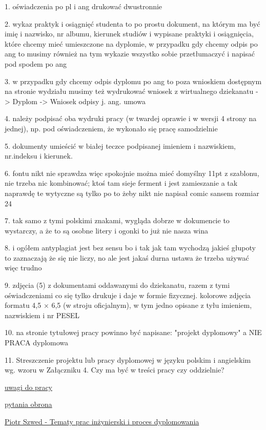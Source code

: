 1. oświadczenia po pl i ang drukować dwustronnie

2. wykaz praktyk i osiągnięć studenta to po prostu dokument, na którym ma być imię i nazwisko, nr albumu, kierunek studiów i wypisane praktyki i osiągnięcia, które chcemy mieć umieszczone na dyplomie, w przypadku gdy chcemy odpis po ang to musimy również na tym wykazie wszystko sobie przetłumaczyć i napisać pod spodem po ang
    
3. w przypadku gdy chcemy odpis dyplomu po ang to poza wnioskiem dostępnym na stronie wydziału musimy też wydrukować wniosek z wirtualnego dziekanatu -> Dyplom -> Wniosek odpisy j. ang. umowa 

4. należy podpisać oba wydruki pracy (w twardej oprawie i w wersji 4 strony na jednej), np. pod oświadczeniem, że wykonało się pracę samodzielnie 

5. dokumenty umieścić w białej teczce podpisanej imieniem i nazwiskiem, nr.indeksu i kierunek.

6. fontu nikt nie sprawdza więc spokojnie można mieć domyślny 11pt z szablonu, nie trzeba nic kombinować; ktoś tam sieje ferment i jest zamieszanie a tak naprawdę te wytyczne są tylko po to żeby nikt nie napisał comic sansem rozmiar 24

7. tak samo z tymi polskimi znakami, wygląda dobrze w dokumencie to wystarczy, a że to są osobne litery i ogonki to już nie nasza wina

8. i ogółem antyplagiat jest bez sensu bo i tak jak tam wychodzą jakieś głupoty to zaznaczają że się nie liczy, no ale jest jakaś durna ustawa że trzeba używać więc trudno

9. zdjęcia (5) z dokumentami oddawanymi do dziekanatu, razem z tymi oświadczeniami co się tylko drukuje i daje w formie fizycznej. kolorowe zdjęcia formatu 4,5 × 6,5 (w stroju oficjalnym), w tym jedno opisane z tyłu imieniem, nazwiskiem i nr PESEL

10. na stronie tytułowej pracy powinno być napisane: "projekt dyplomowy" a NIE PRACA dyplomowa

11. Streszczenie projektu lub pracy dyplomowej w języku polskim i angielskim wg. wzoru w Załączniku 4. Czy ma być w treści pracy czy oddzielnie?


\href{
https://docs.google.com/document/d/1teuj2QOWyLMdtm7R-8wHDmPq2z-jhPZ2pBM2T-85Rhw/edit?fbclid=IwAR2DIe5W2CLKaIuucfKfYNmK2Qp7C3ucZizeC_ChH143hc8uECGxxEkI5N0#heading=h.b7lg7y1i0an9
}{uwagi do pracy}

\href{
https://docs.google.com/document/d/13Z51N8-IKl-xCPCpmJH0JaL9-bdoPklg4x4-XxaClgE/edit?fbclid=IwAR20b3PNkYSgeDMm6de2ZYqtGiTEUl9yZnfmoCo-IeSdBiyrsEvR--ysZRw
}{pytania obrona}

\href{
http://home.agh.edu.pl/~pszwed/wiki/doku.php?id=tematy_prac_inzynierskich
}{Piotr Szwed - Tematy prac inżynierski i proces dyplomowania}